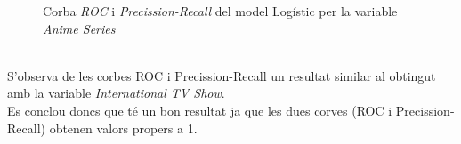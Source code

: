 \documentclass[a4paper, 11pt]{article}
\begin{document}
\begin{figure}[h]
\centering
    \caption{Corba \textit{ROC} i \textit{Precission-Recall} del model Logístic per la variable \textit{Anime Series}}
    \label{fig:my_label}
\end{figure}\\
S'observa de les corbes ROC i Precission-Recall un resultat similar al obtingut amb la variable \textit{International TV Show}.\\
Es conclou doncs que té un bon resultat ja que les dues corves (ROC i Precission-Recall) obtenen valors propers a 1.
\newpage
\end{document}
